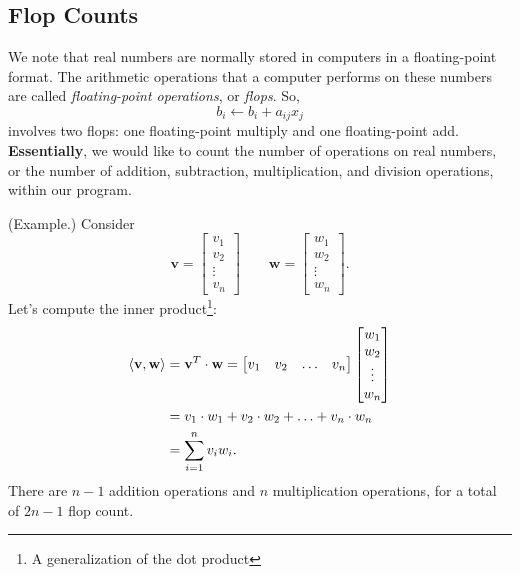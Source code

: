 \documentclass[letterpaper]{article}
\begin{document}
\subsection{Flop Counts}
We note that real numbers are normally stored in computers in a floating-point format. The arithmetic operations that a computer performs on these numbers are called \emph{floating-point operations}, or \emph{flops}. So, 
\[b_i \gets b_i + a_{ij}x_j\]
involves two flops: one floating-point multiply and one floating-point add. \textbf{Essentially}, we would like to count the number of operations on real numbers, or the number of addition, subtraction, multiplication, and division operations, within our program.

\begin{mdframed}
    (Example.) Consider 
    \[\mathbf{v} = \begin{bmatrix}
        v_1 \\ v_2 \\ \vdots \\ v_n
    \end{bmatrix} \qquad \mathbf{w} = \begin{bmatrix}
        w_1 \\ w_2 \\ \vdots \\ w_n
    \end{bmatrix}.\]
    Let's compute the inner product\footnote{A generalization of the dot product}:
    \begin{equation*}
        \begin{aligned}
            \langle \mathbf{v}, \mathbf{w} \rangle &= \mathbf{v}^T \cdot \mathbf{w} = \begin{bmatrix}
                v_1 & v_2 & \hdots & v_n
            \end{bmatrix} \begin{bmatrix}
                w_1 \\ w_2 \\ \vdots \\ w_n
            \end{bmatrix} \\ 
                &= v_1 \cdot w_1 + v_2 \cdot w_2 + \hdots + v_n \cdot w_n \\ 
                &= \sum_{i = 1}^{n} v_i w_i.
        \end{aligned}
    \end{equation*}
    There are $n - 1$ addition operations and $n$ multiplication operations, for a total of $2n - 1$ flop count.
\end{mdframed}
\end{document}
